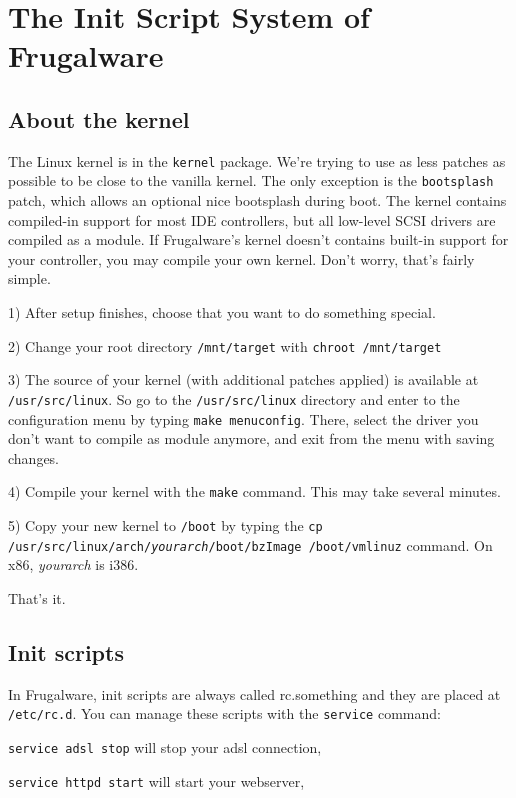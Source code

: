 \chapter{The Init Script System of Frugalware}
\label{chap:init}
\section{About the kernel}

The Linux kernel is in the {\tt kernel} package. We're trying to use as less patches as possible to be close to the vanilla kernel. The only exception is the {\tt bootsplash} patch, which allows an optional nice bootsplash during boot. The kernel contains compiled-in support for most IDE controllers, but all low-level SCSI drivers are compiled as a module. If Frugalware's kernel doesn't contains built-in support for your controller, you may compile your own kernel. Don't worry, that's fairly simple.

1) After setup finishes, choose that you want to do something special.

2) Change your root directory {\tt /mnt/target} with {\tt chroot /mnt/target}

3) The source of your kernel (with additional patches applied) is available at {\tt /usr/src/linux}. So go to the {\tt/usr/src/linux} directory and enter to the configuration menu by typing {\tt make menuconfig}. There, select the driver you don't want to compile as module anymore, and exit from the menu with saving changes.

4) Compile your kernel with the {\tt make} command. This may take several minutes.

5) Copy your new kernel to {\tt /boot} by typing the {\tt cp /usr/src/linux/arch/\textit{yourarch}/boot/bzImage /boot/vmlinuz} command. On x86, \textit{yourarch} is i386. 

That's it.

\section{Init scripts}

In Frugalware, init scripts are always called rc.something and they are placed at {\tt /etc/rc.d}. You can manage these scripts with the {\tt service} command:

{\tt service adsl stop} will stop your adsl connection,

{\tt service httpd start} will start your webserver,

